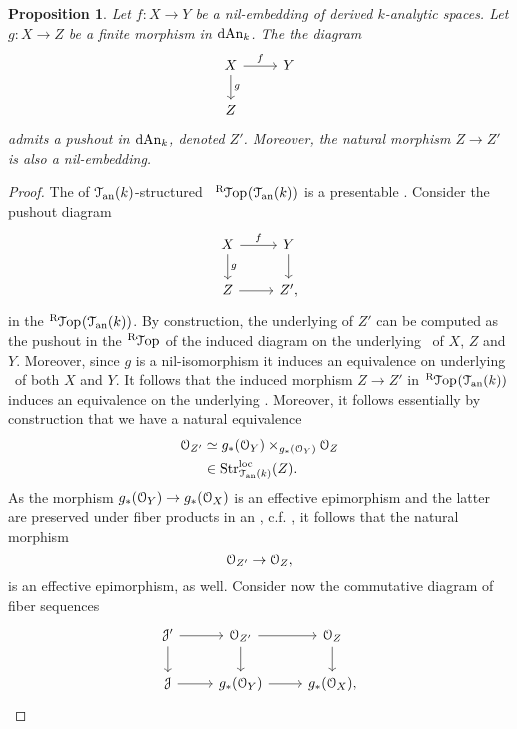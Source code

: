 \documentclass[10pt,a4paper,reqno]{amsart} %
\theoremstyle{plain}
\newtheorem{prop}[thm]{Proposition}
\theoremstyle{definition}
\theoremstyle{remark}
\numberwithin{equation}{section}
\begin{document}
\begin{prop} \label{prop:existence_of_pushouts_along_closed_nil-isomorphisms}
    Let $f \colon X \to Y$ be a nil-embedding of derived $k$-analytic spaces. Let
    $g \colon X \to Z$ be a finite morphism in $\mathrm{dAn}_k$. The the diagram
        \[
        \begin{tikzcd}
            X \ar{r}{f} \ar{d}{g} & Y \\
            Z
        \end{tikzcd}  
        \]
    admits a pushout in $\mathrm{dAn}_k$, denoted $Z'$. Moreover, the natural morphism
    $Z \to Z'$ is also a nil-embedding.
\end{prop}


\begin{proof} The \infcat of $\mathcal T_{\mathrm{an}}(k)$-structured \inftopoi \ $\RTop(\cTank)$ is a presentable \infcat. Consider the pushout diagram
        \[
        \begin{tikzcd}
            X \ar{r}{f} \ar{d}{g} & Y \ar{d} \\
            Z \ar{r} & Z',
        \end{tikzcd}
        \]
    in the \infcat $\RTop(\cTank)$. By construction, the underlying \inftopos of $Z'$ can be computed as the pushout in the \infcat $\RTop$ of
    the induced diagram on the underlying \inftopoi \ of $X$, $Z$ and $Y$. Moreover, since $g$ is a nil-isomorphism it induces an equivalence on underlying \inftopoi \
    of both $X$ and $Y$. It follows that the induced morphism $Z \to Z'$ in $\RTop(\cTank)$ induces an equivalence on the underlying \inftopoi.
    Moreover, it follows essentially by construction that we have a natural equivalence
        \begin{align*}
            \mathcal O_{Z'}  & \simeq g_*(\mathcal O_Y) \times_{g_*(\mathcal O_Y)} \mathcal O_Z \\
                      & \in \mathrm{Str}_{\mathcal T_{\mathrm{an}}(k)}^{\mathrm{loc}}(Z).
        \end{align*}
    As the morphism $g_*(\mathcal O_Y) \to g_*(\mathcal O_X)$ is an effective epimorphism and the latter are preserved under fiber products in an \inftopos, c.f. \cite[Proposition 6.2.3.15]{HTT},
    it follows that the natural morphism
        \[
            \mathcal O_{Z'} \to \mathcal O_Z,  
        \]
    is an effective epimorphism, as well.
    Consider now the commutative diagram of fiber sequences
        \[
        \begin{tikzcd}
            \cJ ' \ar{r} \ar{d} & \cO_{Z'} \ar{r} \ar{d}  & \cO_Z \ar{d} \\
            \cJ \ar{r} & g_*(\cO_Y) \ar{r} & g_*(\cO_X),

\end{tikzcd}\]
\end{proof}
\end{document}
